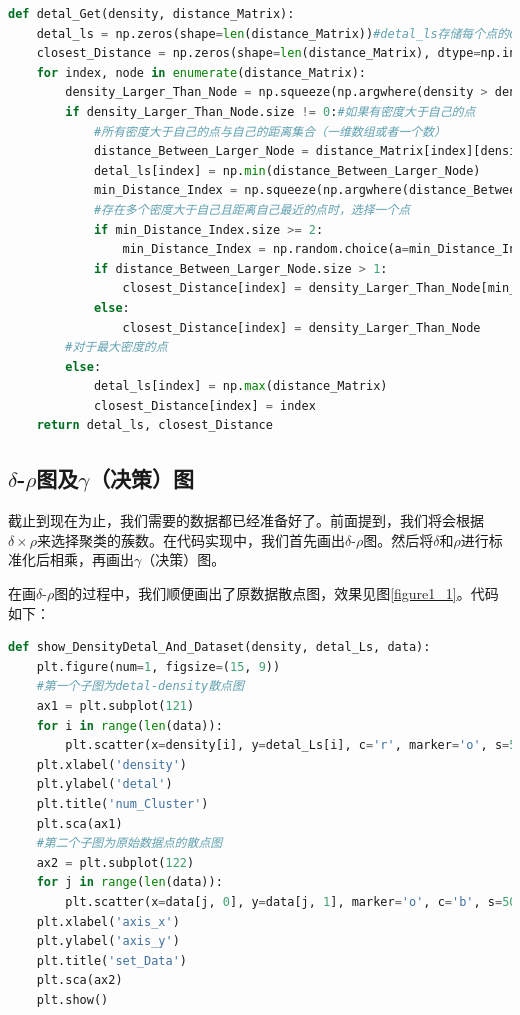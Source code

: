 \begin{lstlisting}[language=python]
def detal_Get(density, distance_Matrix):
    detal_ls = np.zeros(shape=len(distance_Matrix))#detal_ls存储每个点的detal值
    closest_Distance = np.zeros(shape=len(distance_Matrix), dtype=np.int32)#closest_Distance存储比当前点密度高的点集中最近的距离点的索引
    for index, node in enumerate(distance_Matrix):
        density_Larger_Than_Node = np.squeeze(np.argwhere(density > density[index]))#存储比当前点密度大的点
        if density_Larger_Than_Node.size != 0:#如果有密度大于自己的点
            #所有密度大于自己的点与自己的距离集合（一维数组或者一个数）
            distance_Between_Larger_Node = distance_Matrix[index][density_Larger_Than_Node]
            detal_ls[index] = np.min(distance_Between_Larger_Node)
            min_Distance_Index = np.squeeze(np.argwhere(distance_Between_Larger_Node == detal_ls[index]))
            #存在多个密度大于自己且距离自己最近的点时，选择一个点
            if min_Distance_Index.size >= 2:
                min_Distance_Index = np.random.choice(a=min_Distance_Index)
            if distance_Between_Larger_Node.size > 1:
                closest_Distance[index] = density_Larger_Than_Node[min_Distance_Index]
            else:
                closest_Distance[index] = density_Larger_Than_Node
        #对于最大密度的点
        else:
            detal_ls[index] = np.max(distance_Matrix)
            closest_Distance[index] = index
    return detal_ls, closest_Distance
\end{lstlisting}

\subsection{$\delta$-$\rho$图及$\gamma$（决策）图}
截止到现在为止，我们需要的数据都已经准备好了。前面提到，我们将会根据$\delta\times\rho$来选择聚类的蔟数。在代码实现中，我们首先画出$\delta$-$\rho$图。然后将$\delta$和$\rho$进行标准化后相乘，再画出$\gamma$（决策）图。

在画$\delta$-$\rho$图的过程中，我们顺便画出了原数据散点图，效果见图\ref{figure1_1}。代码如下：
\begin{lstlisting}[language=python]
def show_DensityDetal_And_Dataset(density, detal_Ls, data):
    plt.figure(num=1, figsize=(15, 9))
    #第一个子图为detal-density散点图
    ax1 = plt.subplot(121)
    for i in range(len(data)):
        plt.scatter(x=density[i], y=detal_Ls[i], c='r', marker='o', s=50)
    plt.xlabel('density')
    plt.ylabel('detal')
    plt.title('num_Cluster')
    plt.sca(ax1)
    #第二个子图为原始数据点的散点图
    ax2 = plt.subplot(122)
    for j in range(len(data)):
        plt.scatter(x=data[j, 0], y=data[j, 1], marker='o', c='b', s=50)
    plt.xlabel('axis_x')
    plt.ylabel('axis_y')
    plt.title('set_Data')
    plt.sca(ax2)
    plt.show()
\end{lstlisting}


